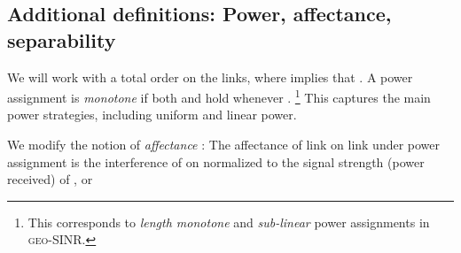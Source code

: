 \documentclass[11pt]{amsart}
\newcounter{foo}
\newcommand{\geomodel}{\textsc{geo-SINR}}
\begin{document}
\iffalse \subsection{Realizing decay spaces}
\label{sec:realizing}

Decay space can either represent the truth-on-the-ground, or
its representation/approximation as data.


Measurements are the most common form of obtaining the decay representation.
Even the more inexpensive wireless gadgets today have a mechanism
to measure \emph{received signal strength} (RSS). Most commonly, the
precision is within 1dB, or about 26\%.
The accuracy is often higher, and by adjusting power settings,
higher precision values can be obtained.

In simulations, where decays must be generated, 
heuristic models are frequently used,
including two-ray and multi-ray models,
and Hata and Okumura models \cite{Goldsmith}.
Most common, perhaps, is to add probabilistic components.
Particularly, \emph{log-normal path loss} consists of 
the geometric decay multiplied by an exponential random variable with unit expectation, independently. 



It is also often possible to \emph{infer} decay from the received transmissions.
Even in the absence of measurement capability, the fact that a packet
was received and decoded gives an indication of its signal strength.
This holds even if both the transmission and the reception have
probabilistic components.
Using basic concentration results, 
precise estimates of signal strength
can be obtained by the \emph{packet reception ratio} (PRR)
by trying different transmission power level.
\fi

\subsection{Additional definitions: Power, affectance, separability}


We will work with a total order  on the links, where  implies that . 
A power assignment  is \emph{monotone} if both 
and  hold whenever .
\footnote{This corresponds to \emph{length monotone} and
  \emph{sub-linear} power assignments in {\geomodel}.} This captures
the main power strategies, including uniform and linear power.


We modify the notion of \emph{affectance} \cite{GHWW09,HW09,KV10}:
The affectance  of link  on link  under power assignment   is the interference of  on  normalized to the signal strength (power received) of , or
\end{document}
